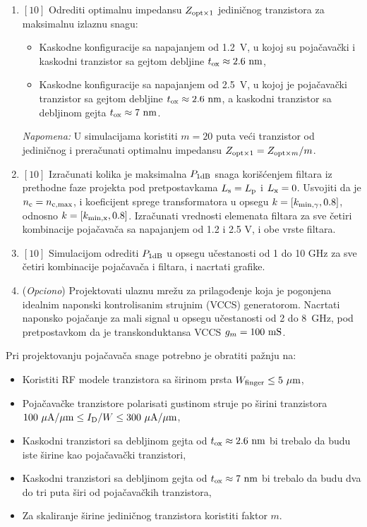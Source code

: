 \documentclass[a4paper]{article}
\begin{document}
\begin{enumerate}

\item $[10]$ Odrediti optimalnu impedansu $Z_{\mathrm{opt\times 1}}$ jediničnog tranzistora za maksimalnu izlaznu snagu:
	\begin{itemize}
		\item Kaskodne konfiguracije sa napajanjem od 1.2~V, u kojoj su pojačavački i kaskodni tranzistor sa gejtom debljine $t_{\mathrm{ox}}\approx 2.6~\mathrm{nm}$,
		\item Kaskodne konfiguracije sa napajanjem od 2.5~V, u kojoj je pojačavački tranzistor sa gejtom debljine $t_{\mathrm{ox}}\approx 2.6~\mathrm{nm}$, a kaskodni tranzistor sa debljinom gejta $t_{\mathrm{ox}}\approx 7~\mathrm{nm}$.
	\end{itemize}
	\textit{Napomena:} U simulacijama koristiti $m=20$ puta veći tranzistor od jediničnog i preračunati optimalnu impedansu $Z_{\mathrm{opt\times 1}} = Z_{\mathrm{opt\times}m}/m$.
\item $[10]$ Izračunati kolika je maksimalna $P_{\mathrm{1dB}}$ snaga korišćenjem filtara iz prethodne faze projekta pod pretpostavkama $L_{\mathrm{s}}=L_{\mathrm{p}}$ i $L_{\mathrm{x}}=0$. Usvojiti da je $n_{\mathrm{c}}=n_{\mathrm{c,max}}$, i koeficijent sprege transformatora u opsegu $k=[k_{\mathrm{min,\gamma}},0.8]$, odnosno $k=[k_{\mathrm{min,x}},0.8]$. Izračunati vrednosti elemenata filtara za sve četiri kombinacije pojačavača sa napajanjem od 1.2 i 2.5 V, i obe vrste filtara.
\item $[10]$ Simulacijom odrediti $P_{\mathrm{1dB}}$ u opsegu učestanosti od 1 do 10 GHz za sve četiri kombinacije pojačavača i filtara, i nacrtati grafike.
\item (\textit{Opciono}) Projektovati ulaznu mrežu za prilagođenje koja je pogonjena idealnim naponski kontrolisanim strujnim (VCCS) generatorom. Nacrtati naponsko pojačanje za mali signal u opsegu učestanosti od 2 do 8~GHz, pod pretpostavkom da je transkonduktansa VCCS $g_m = 100~\mathrm{mS}$.
\end{enumerate}

\newpage

Pri projektovanju pojačavača snage potrebno je obratiti pažnju na:
\begin{itemize}
	\item Koristiti RF modele tranzistora sa širinom prsta $W_{\mathrm{finger}} \leq 5~\mu\mathrm{m}$,
	\item Pojačavačke tranzistore polarisati gustinom struje po širini tranzistora $100~\mu\mathrm{A}/\mu\mathrm{m} \leq I_{\mathrm{D}}/W \leq 300~\mu\mathrm{A}/\mu\mathrm{m}$,
	\item Kaskodni tranzistori sa debljinom gejta od $t_{\mathrm{ox}}\approx 2.6~\mathrm{nm}$ bi trebalo da budu iste širine kao pojačavački tranzistori,
	\item Kaskodni tranzistori sa debljinom gejta od $t_{\mathrm{ox}}\approx 7~\mathrm{nm}$ bi trebalo da budu dva do tri puta širi od pojačavačkih tranzistora,
	\item Za skaliranje širine jediničnog tranzistora koristiti faktor $m$.
\end{itemize}
\end{document}
